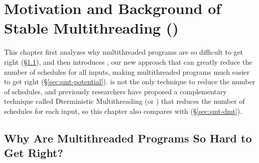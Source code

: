 \chapter{Motivation and Background of Stable Multithreading (\smt)}
\label{sec:smt-motivation}

This chapter first analyzes why multithreaded programs are so
difficult to get right (\S\ref{sec:smt-why}), and then introduces
\smt, our new approach that can greatly reduce the number of schedules for all
inputs, making multithreaded programs much easier to get right
(\S\ref{sec:smt-potential}). \smt is not the only technique to reduce the number
of schedules, and previously researchers have proposed a complementary technique
called Dterministic Multithreading (or \dmt) that reduces the number of
schedules
for each input, so this chapter also compares \smt with \dmt
(\S\ref{sec:smt-dmt}).

\section{Why Are Multithreaded Programs So Hard to Get Right?}
\label{sec:smt-why}

